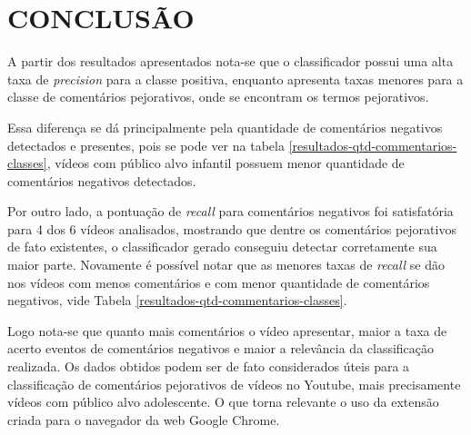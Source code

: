 \newpage
\section{CONCLUSÃO}


A partir dos resultados apresentados nota-se que o classificador possui uma alta taxa de \textit{precision} para a classe positiva, enquanto apresenta taxas menores para a classe de comentários pejorativos, onde se encontram os termos pejorativos.

Essa diferença se dá principalmente pela quantidade de comentários negativos detectados e presentes, pois se pode ver na tabela \ref{resultados-qtd-commentarios-classes}, vídeos com público alvo infantil possuem menor quantidade de comentários negativos detectados.

Por outro lado, a pontuação de \textit{recall} para comentários negativos foi satisfatória para 4 dos 6 vídeos analisados, mostrando que dentre os comentários pejorativos de fato existentes, o classificador gerado conseguiu detectar corretamente sua maior parte. Novamente é possível notar que as menores taxas de \textit{recall} se dão nos vídeos com menos comentários e com menor quantidade de comentários negativos, vide Tabela \ref{resultados-qtd-commentarios-classes}.%


Logo nota-se que quanto mais comentários o vídeo apresentar, maior a taxa de acerto eventos de comentários negativos e maior a relevância da classificação realizada.
Os dados obtidos podem ser de fato considerados úteis para a classificação de comentários pejorativos de vídeos no Youtube, mais precisamente vídeos com público alvo adolescente. O que torna relevante o uso da extensão criada para o navegador da web Google Chrome.
